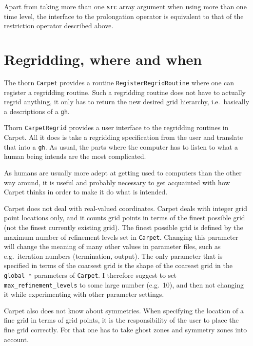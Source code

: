 \documentclass{article}
\begin{document}
   Apart from taking more than one \texttt{src} array argument when
   using more than one time level, the interface to the prolongation
   operator is equivalent to that of the restriction operator
   described above.



\section{Regridding, where and when}

   The thorn \texttt{Carpet} provides a routine
   \texttt{RegisterRegridRoutine} where one can register a regridding
   routine.  Such a regridding routine does not have to actually
   regrid anything, it only has to return the new desired grid
   hierarchy, i.e.\ basically a descriptions of a \texttt{gh}.

   Thorn \texttt{CarpetRegrid} provides a user interface to the
   regridding routines in Carpet.  All it does is take a regridding
   specification from the user and translate that into a \texttt{gh}.
   As usual, the parts where the computer has to listen to what a
   human being intends are the most complicated.

   As humans are usually more adept at getting used to computers than
   the other way around, it is useful and probably necessary to get
   acquainted with how Carpet thinks in order to make it do what is
   intended.

   Carpet does not deal with real-valued coordinates.  Carpet deals
   with integer grid point locations only, and it counts grid points
   in terms of the finest possible grid (not the finest currently
   existing grid).  The finest possible grid is defined by the maximum
   number of refinement levels set in \texttt{Carpet}.  Changing this
   parameter will change the meaning of many other values in parameter
   files, such as e.g.\ iteration numbers (termination, output).  The
   only parameter that is specified in terms of the coarsest grid is
   the shape of the coarsest grid in the \texttt{global\_*} parameters
   of \texttt{Carpet}.  I therefore suggest to set
   \texttt{max\_refinement\_levels} to some large number (e.g.\ 10),
   and then not changing it while experimenting with other parameter
   settings.

   Carpet also does not know about symmetries.  When specifying the
   location of a fine grid in terms of grid points, it is the
   responsibility of the user to place the fine grid correctly.  For
   that one has to take ghost zones and symmetry zones into account.
\end{document}
